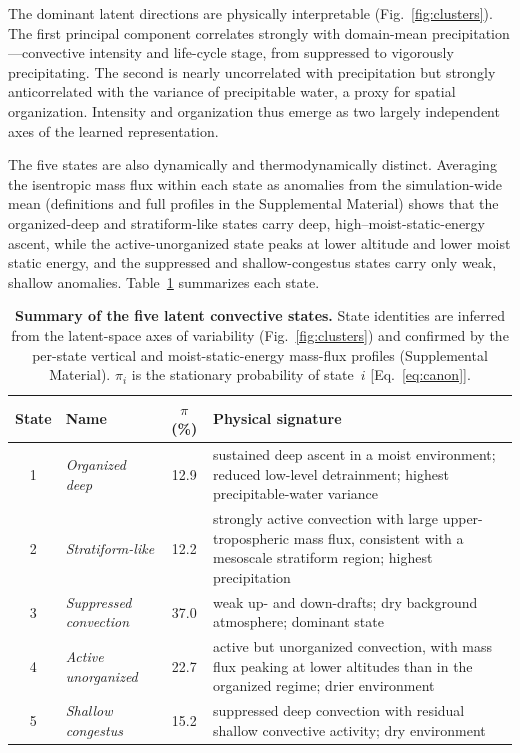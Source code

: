 \documentclass[
    aps,
    prl,
    reprint,
    superscriptaddress,
    amsmath,amssymb,
    floatfix,
    nofootinbib
]{revtex4-2}
\begin{document}
The dominant latent directions are physically interpretable (Fig.~\ref{fig:clusters}). The first principal component correlates strongly with domain-mean precipitation---convective intensity and life-cycle stage, from suppressed to vigorously precipitating. The second is nearly uncorrelated with precipitation but strongly anticorrelated with the variance of precipitable water, a proxy for spatial organization. Intensity and organization thus emerge as two largely independent axes of the learned representation.

The five states are also dynamically and thermodynamically distinct. Averaging the isentropic mass flux within each state as anomalies from the simulation-wide mean (definitions and full profiles in the Supplemental Material) shows that the organized-deep and stratiform-like states carry deep, high--moist-static-energy ascent, while the active-unorganized state peaks at lower altitude and lower moist static energy, and the suppressed and shallow-congestus states carry only weak, shallow anomalies. Table~\ref{tab:state_summary} summarizes each state.

\begin{table}[t]
\centering
\begin{ruledtabular}
\begin{tabular}{c l c p{}}
State & Name & $\pi$ (\%) & Physical signature \\
\hline
1 & \emph{Organized deep}     & 12.9 & sustained deep ascent in a moist environment; reduced low-level detrainment; highest precipitable-water variance \\
2 & \emph{Stratiform-like}    & 12.2 & strongly active convection with large upper-tropospheric mass flux, consistent with a mesoscale stratiform region; highest precipitation \\
3 & \emph{Suppressed convection} & 37.0 & weak up- and down-drafts; dry background atmosphere; dominant state \\
4 & \emph{Active unorganized}     & 22.7 & active but unorganized convection, with mass flux peaking at lower altitudes than in the organized regime; drier environment \\
5 & \emph{Shallow congestus}      & 15.2 & suppressed deep convection with residual shallow convective activity; dry environment \\
\end{tabular}
\end{ruledtabular}
\caption{\textbf{Summary of the five latent convective states.} State identities are inferred from the latent-space axes of variability (Fig.~\ref{fig:clusters}) and confirmed by the per-state vertical and moist-static-energy mass-flux profiles (Supplemental Material). $\pi_i$ is the stationary probability of state~$i$ [Eq.~\eqref{eq:canon}].}
\label{tab:state_summary}
\end{table}
\end{document}
